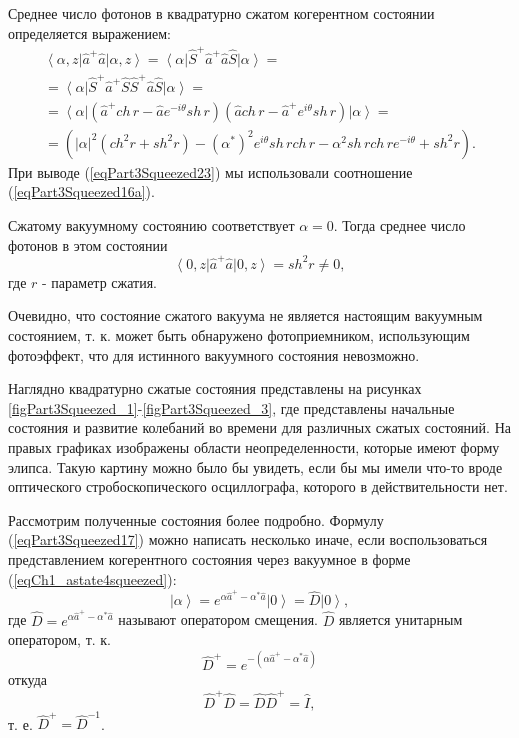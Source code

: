 Среднее число фотонов в квадратурно сжатом когерентном состоянии
определяется выражением:
\begin{eqnarray}
\left<\alpha, z\right|\hat{a}^{+}\hat{a}\left|\alpha, z\right> =
\left<\alpha\right|\hat{S}^{+}\hat{a}^{+}\hat{a}\hat{S}\left|\alpha\right>
=
\nonumber \\
=
\left<\alpha\right|\hat{S}^{+}\hat{a}^{+}\hat{S}\hat{S}^{+}\hat{a}\hat{S}\left|\alpha\right>
= 
\nonumber \\
=
\left<\alpha\right|
\left(\hat{a}^{+} ch\,r - \hat{a}e^{-i\theta}sh\,r\right)
\left(\hat{a} ch\,r - \hat{a}^{+} e^{i\theta}sh\,r\right)
\left|\alpha\right> = 
\nonumber \\
=
\left(
\left|\alpha\right|^2\left(ch^2 r + sh^2 r\right) -
\left(\alpha^{*}\right)^2
e^{i\theta} sh\,r ch\,r - 
\alpha^2 sh\,r ch\,r e^{- i\theta} + sh^2 r
\right).
\label{eqPart3Squeezed23}
\end{eqnarray}
При выводе (\ref{eqPart3Squeezed23}) мы использовали соотношение
(\ref{eqPart3Squeezed16a}).

Сжатому вакуумному состоянию соответствует $\alpha = 0$. Тогда среднее
число фотонов в этом состоянии
\begin{equation}
\left<0, z\right|\hat{a}^{+}\hat{a}\left|0, z\right> =
sh^2 r \ne 0,
\label{eqPart3Squeezed24}
\end{equation}
где $r$ - параметр сжатия.

Очевидно, что состояние сжатого вакуума не является настоящим
вакуумным состоянием, т. к. может быть обнаружено фотоприемником,
использующим фотоэффект, что для истинного вакуумного состояния
невозможно.




%
%

Наглядно квадратурно сжатые  состояния представлены на рисунках
\ref{figPart3Squeezed_1}-\ref{figPart3Squeezed_3}, где представлены
начальные состояния и развитие колебаний во 
времени для различных сжатых состояний. На правых графиках изображены
области неопределенности, которые имеют форму элипса. Такую картину
можно было бы увидеть, если бы мы имели что-то вроде оптического
стробоскопического осциллографа, которого в действительности нет.

Рассмотрим полученные состояния более подробно. Формулу
(\ref{eqPart3Squeezed17}) можно написать несколько иначе, если
воспользоваться представлением когерентного состояния через вакуумное
в форме (\ref{eqCh1_astate4squeezed}):
\begin{equation}
\left|\alpha\right> =  
e^{\alpha \hat{a}^{+} - \alpha^{*} \hat{a}}\left|0\right> = 
\hat{D}\left|0\right>,
\nonumber
\end{equation}
где $\hat{D} = e^{\alpha \hat{a}^{+} - \alpha^{*} \hat{a}}$ называют
оператором смещения. $\hat{D}$ является унитарным оператором, т. к. 
\[
\hat{D}^{+} = e^{-\left(\alpha \hat{a}^{+} - \alpha^{*} \hat{a}\right)}
\]
откуда
\[
\hat{D}^{+} \hat{D} = \hat{D} \hat{D}^{+} =\hat{I},
\]
т. е. $\hat{D}^{+} = \hat{D}^{-1}$.

